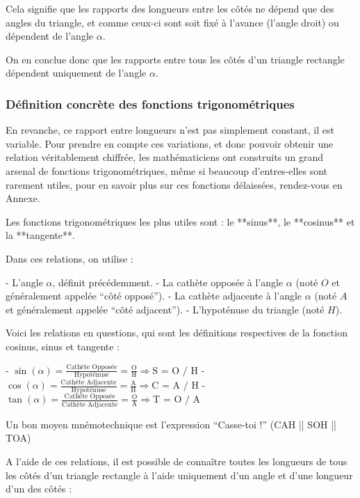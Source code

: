 \documentclass[a4paper]{article}
\begin{document}
			Cela signifie que les rapports des longueurs entre les côtés ne dépend que des angles du triangle, et comme ceux-ci sont soit fixé à l'avance (l'angle droit) ou dépendent de l'angle $\alpha$. 

			On en conclue donc que les rapports entre tous les côtés d'un triangle rectangle dépendent uniquement de l'angle $\alpha$.

		\subsubsection{Définition concrète des fonctions trigonométriques}

			En revanche, ce rapport entre longueurs n'est pas simplement constant, il est variable. Pour prendre en compte ces variations, et donc pouvoir obtenir une relation véritablement chiffrée, les mathématiciens ont construits un grand arsenal de fonctions trigonométriques, même si beaucoup d'entres-elles sont rarement utiles, pour en savoir plus sur ces fonctions délaissées, rendez-vous en Annexe.

			Les fonctions trigonométriques les plus utiles sont : le **sinus**, le **cosinus** et la **tangente**.

			Dans ces relations, on utilise : 

			- L'angle $\alpha$, définit précédemment.
			- La cathète opposée à l'angle $\alpha$ (noté $O$ et généralement appelée “côté opposé”).
			- La cathète adjacente à l'angle $\alpha$ (noté $A$ et généralement appelée “côté adjacent”).
			- L'hypoténuse du triangle (noté $H$).

			Voici les relations en questions, qui sont les définitions respectives de la fonction cosinus, sinus et tangente :

			- $\sin(\alpha) = \frac{\text{Cathète Opposée}}{\text{Hypoténuse}} = \frac{\text{O}}{\text{H}} \Longrightarrow \text{S = O / H} $
			- $\cos(\alpha) = \frac{\text{Cathète Adjacente}}{\text{Hypoténuse}} = \frac{\text{A}}{\text{H}} \Longrightarrow \text{C = A / H} $
			- $\tan(\alpha) = \frac{\text{Cathète Opposée}}{\text{Cathète Adjacente}} = \frac{\text{O}}{\text{A}} \Longrightarrow \text{T = O / A} $

			Un bon moyen mnémotechnique est l'expression “Casse-toi !” (CAH || SOH || TOA)

			A l'aide de ces relations, il est possible de connaître toutes les longueurs de tous les côtés d'un triangle rectangle à l'aide uniquement d'un angle et d'une longueur d'un des côtés : 
\end{document}
